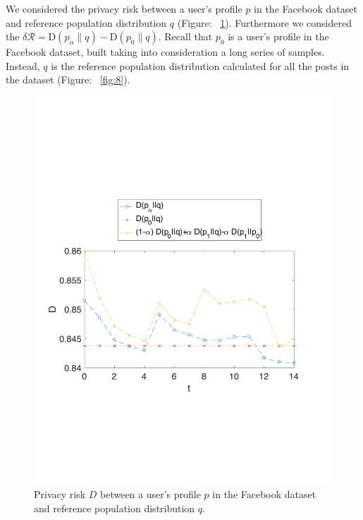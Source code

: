 We considered the privacy risk between a user's profile $p$ in the Facebook dataset and reference population distribution $q$ (Figure: ~\ref{fig:7}). Furthermore we considered the $\delta \mathcal{R} = \text{D}(p_\alpha\|q) - \text{D}(p_0\|q)$. Recall that $p_0$ is a user's profile in the Facebook dataset, built taking into consideration a long series of samples. Instead, $q$ is the reference population distribution calculated for all the posts in the dataset (Figure: ~\ref{fig:8}).

\begin{figure}[htb]
\includegraphics[scale=\textwidth]{figures/experiment1.pdf}
\caption[Privacy risk for a given user's profile in the Facebook dataset and a reference distribution]{Privacy risk $D$ between a user's profile $p$ in the Facebook dataset and reference population distribution $q$.}
\label{fig:7}
\end{figure}

